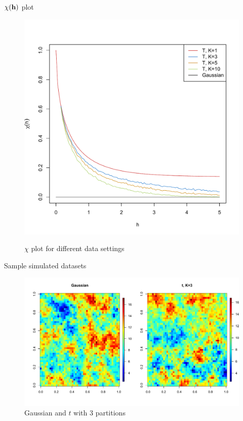 \documentclass{beamer}
\begin{document}
\begin{frame}{$\chi(\mbox{\bf h})$ plot}
  \vspace{-2em}
  \centering
  \begin{figure}
  \includegraphics[width=.7\linewidth]{./plots/pot/chi-h.pdf}\\[-0.4in]
  \caption{$\chi$ plot for different data settings}
  \end{figure}
\end{frame}

\begin{frame}{Sample simulated datasets}
  \centering
  \begin{figure}
  \includegraphics[width=1\linewidth]{./plots/pot/gauss-vs-t3.pdf}
  \caption{Gaussian and $t$ with 3 partitions}
  \end{figure}
\end{frame}
\end{document}
